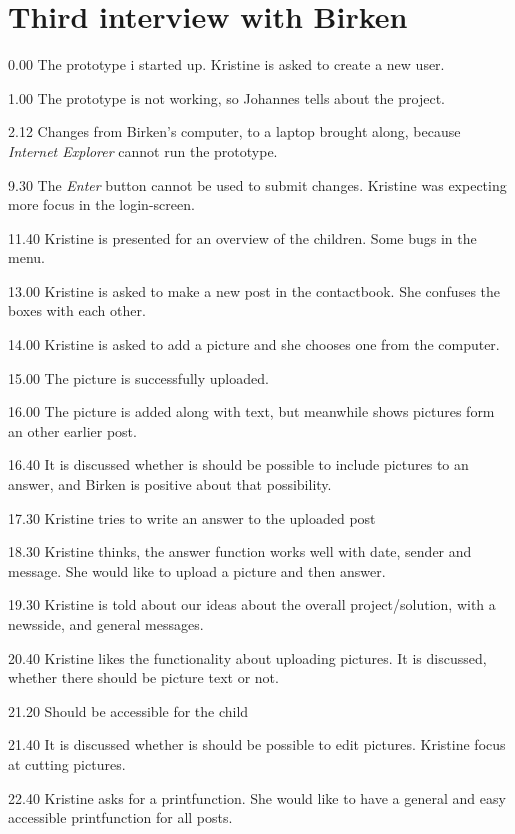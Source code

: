 \section{Third interview with Birken}
\label{third_interview}

0.00
The prototype i started up.
Kristine is asked to create a new user.

1.00
The prototype is not working, so Johannes tells about the project.

2.12
Changes from Birken's computer, to a laptop brought along, because \textit{Internet Explorer} cannot run the prototype.

9.30
The \textit{Enter} button cannot be used to submit changes. Kristine was expecting more focus in the login-screen.

11.40
Kristine is presented for an overview of the children.
Some bugs in the menu.

13.00
Kristine is asked to make a new post in the contactbook. She confuses the boxes with each other.

14.00
Kristine is asked to add a picture and she chooses one from the computer.

15.00
The picture is successfully uploaded.

16.00
The picture is added along with text, but meanwhile shows pictures form an other earlier post.

16.40
It is discussed whether is should be possible to include pictures to an answer, and Birken is positive about that possibility.

17.30
Kristine tries to write an answer to the uploaded post

18.30
Kristine thinks, the answer function works well with date, sender and message. She would like to upload a picture and then answer.

19.30
Kristine is told about our ideas about the overall project/solution, with a newsside, and general messages.

20.40
Kristine likes the functionality about uploading pictures.
It is discussed, whether there should be picture text or not.

21.20
Should be accessible for the child 

21.40
It is discussed whether is should be possible to edit pictures. Kristine focus at cutting pictures.

22.40
Kristine asks for a printfunction. She would like to have a general and easy accessible printfunction for all posts.

